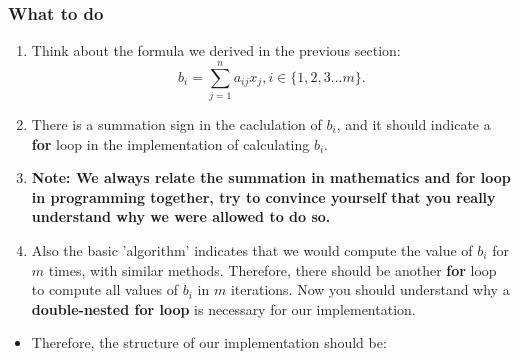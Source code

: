 \subsubsection*{What to do}
\begin{enumerate}
    \item Think about the formula we derived in the previous section:
    \[
    b_i = \sum_{j = 1}^{n} a_{ij} x_j, i \in \{1, 2, 3 \ldots m\}
    .\] 
  \item There is a summation sign in the caclulation of $b_i$, and it should indicate a \textbf{for} loop in the implementation of calculating $b_i$.
  \item \textbf{Note: We always relate the summation in mathematics and for loop in programming together, try to convince yourself that you really understand why we were allowed to do so.}
  \item Also the basic 'algorithm' indicates that we would compute the value of $b_i$ for $m$ times, with similar methods. Therefore, there should be another \textbf{for} loop to compute all values of $b_i$ in $m$ iterations. Now you should understand why a \textbf{double-nested for loop} is necessary for our implementation.
\end{enumerate}
\begin{itemize}
   \item Therefore, the structure of our implementation should be:
     
\end{itemize}

